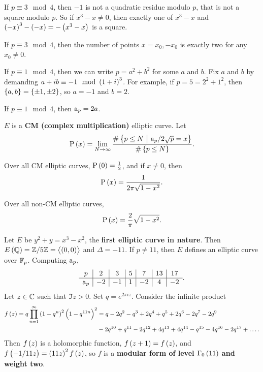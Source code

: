 If $ p \equiv 3 \mod 4 $, then $ -1 $ is not a quadratic residue modulo $ p $, that is not a square modulo $ p $. So if $ x^3 - x \ne 0 $, then exactly one of $ x^3 - x $ and $ \br{-x}^3 - \br{-x} = -\br{x^3 - x} $ is a square.

\begin{proposition}
If $ p \equiv 3 \mod 4 $, then the number of points $ x = x_0, -x_0 $ is exactly two for any $ x_0 \ne 0 $.
\end{proposition}

If $ p \equiv 1 \mod 4 $, then we can write $ p = a^2 + b^2 $ for some $ a $ and $ b $. Fix $ a $ and $ b $ by demanding $ a + ib \equiv -1 \mod \br{1 + i}^3 $. For example, if $ p = 5 = 2^2 + 1^2 $, then $ \cbr{a, b} = \cbr{\pm 1, \pm 2} $, so $ a = -1 $ and $ b = 2 $.

\begin{proposition}
If $ p \equiv 1 \mod 4 $, then $ \mathrm{a}_p = 2a $.
\end{proposition}

$ E $ is a \textbf{CM (complex multiplication)} elliptic curve. Let
$$ \P\br{x} = \lim_{N \to \infty} \dfrac{\#\cbr{p \le N \st \a_p / 2\sqrt{p} = x}}{\#\cbr{p \le N}}. $$

\begin{theorem}[Hecke 1920]
Over all CM elliptic curves, $ \P\br{0} = \tfrac{1}{2} $, and if $ x \ne 0 $, then
$$ \P\br{x} = \dfrac{1}{2\pi\sqrt{1 - x^2}}. $$
\end{theorem}

\begin{theorem}
Over all non-CM elliptic curves,
$$ \P\br{x} = \dfrac{2}{\pi}\sqrt{1 - x^2}. $$
\end{theorem}

Let $ E $ be $ y^2 + y = x^3 - x^2 $, the \textbf{first elliptic curve in nature}. Then $ E\br{\QQ} = \ZZ / 5\ZZ = \abr{\br{0, 0}} $ and $ \Delta = -11 $. If $ p \ne 11 $, then $ E $ defines an elliptic curve over $ \mathbb{F}_p $. Computing $ \mathrm{a}_p $,
$$
\begin{array}{c|c|c|c|c|c|c}
p & 2 & 3 & 5 & 7 & 13 & 17 \\
\hline
\mathrm{a}_p & -2 & -1 & 1 & -2 & 4 & -2
\end{array}.
$$
Let $ z \in \mathbb{C} $ such that $ \Im z > 0 $. Set $ q = e^{2\pi iz} $. Consider the infinite product
\begin{align*}
f\br{z}
= q\prod_{n = 1}^\infty \br{1 - q^n}^2\br{1 - q^{11n}}^2
& = q - 2q^2 - q^3 + 2q^4 + q^5 + 2q^6 - 2q^7 - 2q^9 \\
& - 2q^{10} + q^{11} - 2q^{12} + 4q^{13} + 4q^{14} - q^{15} - 4q^{16} - 2q^{17} + \dots.
\end{align*}
Then $ f\br{z} $ is a holomorphic function, $ f\br{z + 1} = f\br{z} $, and $ f\br{-1 / 11z} = \br{11z}^2f\br{z} $, so $ f $ is a \textbf{modular form of level $ \Gamma_0\br{11} $ and weight two}.

